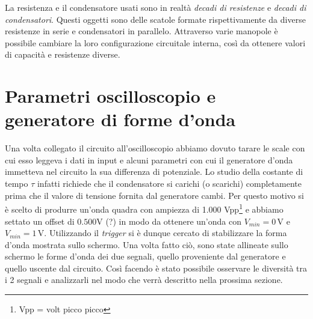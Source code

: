 La resistenza e il condensatore usati sono in realtà \textit{decadi di resistenze} e \textit{decadi di condensatori}. Questi oggetti sono delle scatole formate rispettivamente da diverse resistenze in serie e condensatori in parallelo. Attraverso varie manopole è possibile cambiare la loro configurazione circuitale interna, così da ottenere valori di capacità e resistenze diverse. 

\section{Parametri oscilloscopio e generatore di forme d'onda}

Una volta collegato il circuito all'oscilloscopio abbiamo dovuto tarare le scale con cui esso leggeva i dati in input e alcuni parametri con cui il generatore d'onda immetteva nel circuito la sua differenza di potenziale. Lo studio della costante di tempo $\tau$ infatti richiede che il condensatore si carichi (o scarichi) completamente prima che il valore di tensione fornita dal generatore cambi. Per questo motivo si è scelto di produrre un'onda quadra con ampiezza di 1.000 Vpp\footnote{Vpp = volt picco picco} e abbiamo settato un offset di $0.500\si{\volt}$ (?) in modo da ottenere un'onda con $V_{min}=0\,\si{\volt}$ e $V_{min}=1\,\si{\volt}$. Utilizzando il \textit{trigger} si è dunque cercato di stabilizzare la forma d'onda mostrata sullo schermo. Una volta fatto ciò, sono state allineate sullo schermo le forme d'onda dei due segnali, quello proveniente dal generatore e quello uscente dal circuito. Così facendo è stato possibile osservare le diversità tra i 2 segnali e analizzarli nel modo che verrà descritto nella prossima sezione.
 